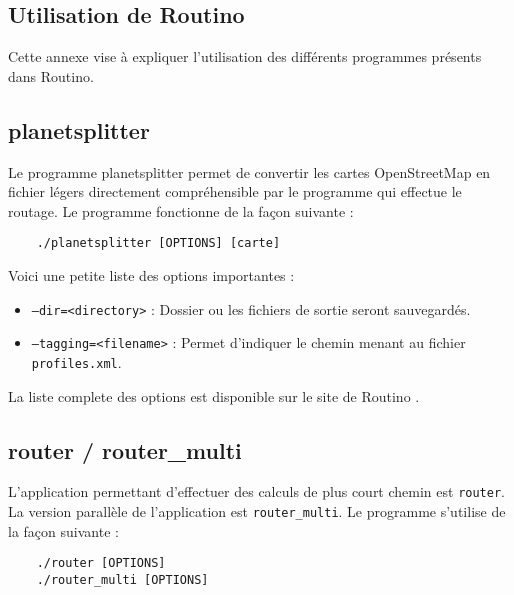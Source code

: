 \begin{appendices}
  \section{Utilisation de Routino}
  \label{ann:routino}

  Cette annexe vise à expliquer l'utilisation des différents programmes présents
  dans Routino.

  \subsection{planetsplitter}
  
  Le programme planetsplitter permet de convertir les cartes OpenStreetMap en 
  fichier légers directement compréhensible par le programme qui effectue le 
  routage. Le programme fonctionne de la façon suivante : \\
  
  \begin{lstlisting}
    ./planetsplitter [OPTIONS] [carte]  
  \end{lstlisting}
  \vspace{1em}

  Voici une petite liste des options importantes :
  
  \begin{itemize}
    \renewcommand{\labelitemi}{$\bullet$}
  \item \texttt{--dir=<directory>} : Dossier ou les fichiers de sortie seront 
    sauvegardés.
  \item \texttt{--tagging=<filename>} : Permet d'indiquer le chemin menant au 
    fichier \texttt{profiles.xml}.\\
  \end{itemize}

  La liste complete des options est disponible sur le site de Routino 
  \cite{bishop_routino_????}.
  
  \subsection{router / router\_multi}
  
  L'application permettant d'effectuer des calculs de plus court chemin est 
  \texttt{router}. La version parallèle de l'application est 
  \texttt{router\_multi}. Le programme s'utilise de la façon suivante : \\

  \begin{lstlisting}
    ./router [OPTIONS]
    ./router_multi [OPTIONS]
  \end{lstlisting}
  \vspace{1em}


\end{appendices}
